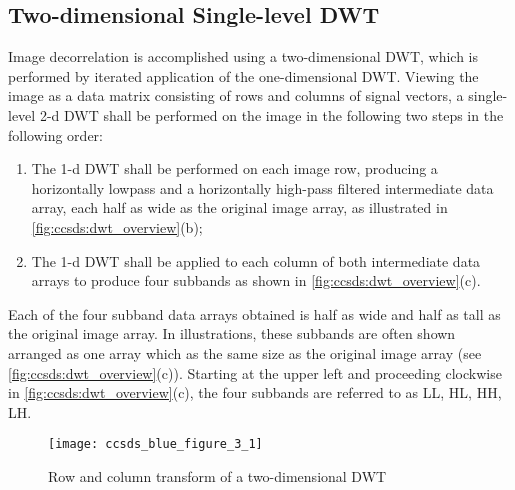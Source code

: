 \subsection{Two-dimensional Single-level DWT}\label{subsec:2d_dwt}
Image decorrelation is accomplished using a two-dimensional DWT, which is performed by iterated application of the one-dimensional DWT. Viewing the image as a data matrix consisting of rows and columns of signal vectors, a single-level 2-d DWT shall be performed on the image in the following two steps in the following order:
\begin{enumerate}
\item The 1-d DWT shall be performed on each image row, producing a horizontally lowpass and a horizontally high-pass filtered intermediate data array, each half as wide as the original image array, as illustrated in \autoref{fig:ccsds:dwt_overview}(b);
\item The 1-d DWT shall be applied to each column of both intermediate data arrays to produce four subbands as shown in \autoref{fig:ccsds:dwt_overview}(c).
\end{enumerate}
Each of the four subband data arrays obtained is half as wide and half as tall as the original image array. In illustrations, these subbands are often shown arranged as one array which as the same size as the original image array (see \autoref{fig:ccsds:dwt_overview}(c)). Starting at the upper left and proceeding clockwise in \autoref{fig:ccsds:dwt_overview}(c), the four subbands are referred to as LL, HL, HH, LH.

\begin{figure}[tb]
  \centering
  \texttt{[image: ccsds\_blue\_figure\_3\_1]}
  \caption{Row and column transform of a two-dimensional DWT\cite{CCSDS122blue}}
  \label{fig:ccsds:dwt_overview}
\end{figure}

